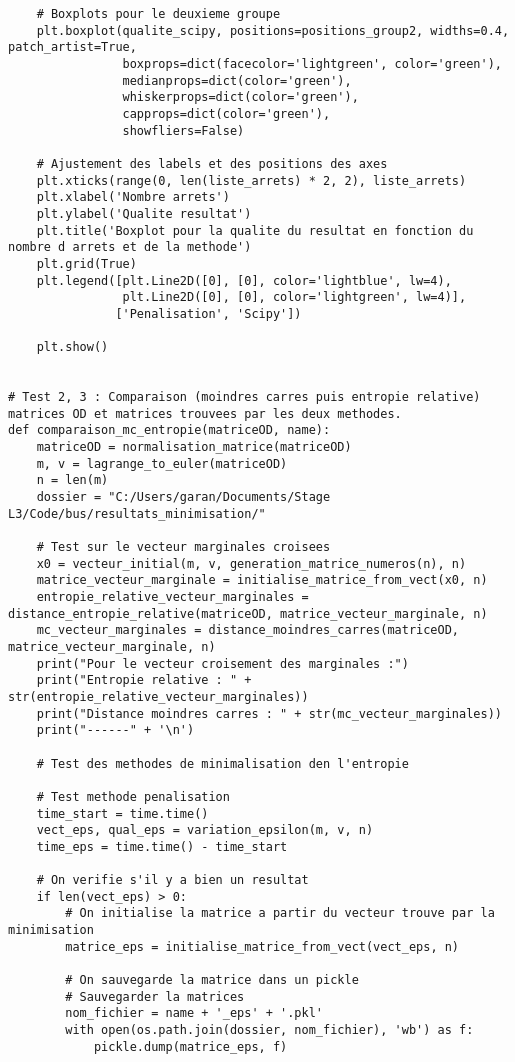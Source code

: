 \documentclass[12pt]{article}
\begin{document}
\begin{lstlisting}
    # Boxplots pour le deuxieme groupe
    plt.boxplot(qualite_scipy, positions=positions_group2, widths=0.4, patch_artist=True,
                boxprops=dict(facecolor='lightgreen', color='green'),
                medianprops=dict(color='green'),
                whiskerprops=dict(color='green'),
                capprops=dict(color='green'),
                showfliers=False)

    # Ajustement des labels et des positions des axes
    plt.xticks(range(0, len(liste_arrets) * 2, 2), liste_arrets)
    plt.xlabel('Nombre arrets')
    plt.ylabel('Qualite resultat')
    plt.title('Boxplot pour la qualite du resultat en fonction du nombre d arrets et de la methode')
    plt.grid(True)
    plt.legend([plt.Line2D([0], [0], color='lightblue', lw=4),
                plt.Line2D([0], [0], color='lightgreen', lw=4)],
               ['Penalisation', 'Scipy'])

    plt.show()


# Test 2, 3 : Comparaison (moindres carres puis entropie relative) matrices OD et matrices trouvees par les deux methodes.
def comparaison_mc_entropie(matriceOD, name):
    matriceOD = normalisation_matrice(matriceOD)
    m, v = lagrange_to_euler(matriceOD)
    n = len(m)
    dossier = "C:/Users/garan/Documents/Stage L3/Code/bus/resultats_minimisation/"

    # Test sur le vecteur marginales croisees
    x0 = vecteur_initial(m, v, generation_matrice_numeros(n), n)
    matrice_vecteur_marginale = initialise_matrice_from_vect(x0, n)
    entropie_relative_vecteur_marginales = distance_entropie_relative(matriceOD, matrice_vecteur_marginale, n)
    mc_vecteur_marginales = distance_moindres_carres(matriceOD, matrice_vecteur_marginale, n)
    print("Pour le vecteur croisement des marginales :")
    print("Entropie relative : " + str(entropie_relative_vecteur_marginales))
    print("Distance moindres carres : " + str(mc_vecteur_marginales))
    print("------" + '\n')

    # Test des methodes de minimalisation den l'entropie

    # Test methode penalisation
    time_start = time.time()
    vect_eps, qual_eps = variation_epsilon(m, v, n)
    time_eps = time.time() - time_start

    # On verifie s'il y a bien un resultat
    if len(vect_eps) > 0:
        # On initialise la matrice a partir du vecteur trouve par la minimisation
        matrice_eps = initialise_matrice_from_vect(vect_eps, n)

        # On sauvegarde la matrice dans un pickle
        # Sauvegarder la matrices
        nom_fichier = name + '_eps' + '.pkl'
        with open(os.path.join(dossier, nom_fichier), 'wb') as f:
            pickle.dump(matrice_eps, f)


\end{lstlisting}
\end{document}
